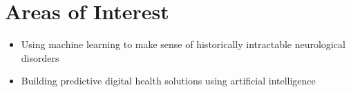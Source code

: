 \section{Areas of Interest}
\closesection

\begin{itemize}
    \item Using machine learning to make sense of historically intractable neurological disorders
    \item Building predictive digital health solutions using artificial intelligence
\end{itemize}